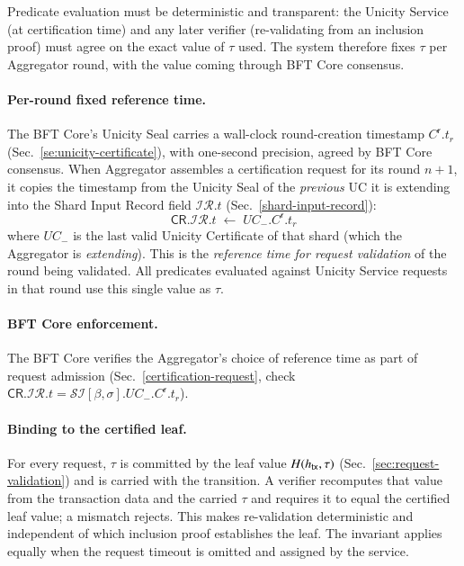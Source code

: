 \index{$\tau$}
Predicate evaluation must be deterministic and transparent: the Unicity Service (at certification time) and any later verifier (re-validating from an inclusion proof) must agree on the exact value of $\tau$ used. The system therefore fixes $\tau$ per Aggregator round, with the value coming through BFT Core consensus.

\paragraph{Per-round fixed reference time.}
The BFT Core's Unicity Seal carries a wall-clock round-creation timestamp $C^\mathsf{r}.t_r$ (Sec.~\ref{se:unicity-certificate}), with one-second precision, agreed by BFT Core consensus. When Aggregator assembles a certification request for its round $n{+}1$, it copies the timestamp from the Unicity Seal of the \emph{previous} UC it is extending into the Shard Input Record field $\mathcal{IR}.t$ (Sec.~\ref{shard-input-record}):
\[
	\mathsf{CR}.\mathcal{IR}.t \;\gets\; UC_-.C^\mathsf{r}.t_r
\]
where $UC_-$ is the last valid Unicity Certificate of that shard (which the Aggregator is \emph{extending}). This is the \emph{reference time for request validation} of the round being validated. All predicates evaluated against Unicity Service requests in that round use this single value as $\tau$.

\paragraph{BFT Core enforcement.}
The BFT Core verifies the Aggregator's choice of reference time as part of request admission (Sec.~\ref{certification-request}, check $\mathsf{CR}.\mathcal{IR}.t = \mathcal{SI}[\beta,\sigma].UC_-.C^\mathsf{r}.t_r$).

\paragraph{Binding to the certified leaf.}
For every request, $\tau$ is committed by the leaf value $H({h_\mathsf{tx}}, \tau)$ (Sec.~\ref{sec:request-validation}) and is carried with the transition. A verifier recomputes that value from the transaction data and the carried $\tau$ and requires it to equal the certified leaf value; a mismatch rejects. This makes re-validation deterministic and independent of which inclusion proof establishes the leaf. The invariant applies equally when the request timeout is omitted and assigned by the service.

